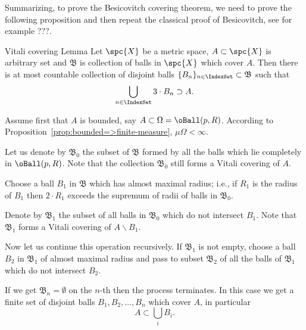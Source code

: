 Summarizing, to prove the Besicovitch covering theorem,
we need to prove the following proposition and then repeat the 
classical proof of Besicovitch, see for example ???.































\begin{thm}{Vitali covering Lemma}\label{lem:vitali}
Let $\spc{X}$ be a metric space,
$A\subset \spc{X}$ is arbitrary set
and
$\mathfrak{B}$ is collection of balls in $\spc{X}$ which cover $A$.
Then there is at most countable collection of disjoint balls 
$\{B_n\}_{n\in\IndexSet}\subset\mathfrak{B}$ such that
$$\bigcup_{n\in\IndexSet} 3\cdot B_n\supset A.$$
\end{thm}


Assume first that $A$ is bounded,
say $A\subset \Omega=\oBall(p,R)$.
According to Proposition~\ref{prop:bounded=>finite-measure}, $\mu \Omega<\infty$.

Let us denote by $\mathfrak{B}_0$ the subset of $\mathfrak{B}$ formed by all the balls which lie completely in $\oBall(p,R)$.
Note that the collection $\mathfrak{B}_0$ 
still forms a 
Vitali covering of $A$.

Choose a ball $B_1$ in  $\mathfrak{B}$
which has almost maximal radius;
i.e., if $R_1$ is the radius of $B_1$ 
then $2\cdot R_1$ exceeds the supremum of radii of balls in $\mathfrak{B}_0$.

Denote by $\mathfrak{B}_1$ the subset of all balls in $\mathfrak{B}_0$ which do not intersect $B_1$.
Note that $\mathfrak{B}_1$ forms a Vitali covering of $A\backslash B_1$.

Now let us continue this operation recursively.
If $\mathfrak{B}_1$ is not empty, choose a ball $B_2$ in $\mathfrak{B}_1$ of almost maximal radius 
and pass to subset $\mathfrak{B}_2$ of all the balls of $\mathfrak{B}_1$ which do not intersect $B_2$.

If we get $\mathfrak{B}_n=\emptyset$ on the $n$-th then the process terminates.
In this case we get a finite set of disjoint balls $B_1,B_2,\dots,B_n$ which cover $A$,
in particular 
\[ A\subset \bigcup_iB_i. 
\]

